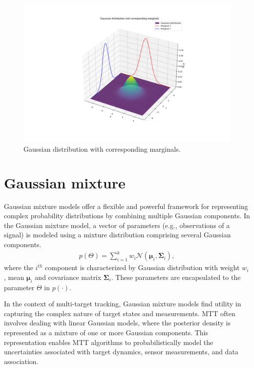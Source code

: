 \begin{figure}[htbp]
    \centering
    \includegraphics[width=1\textwidth]{text/chapter_01/imgs/gauss_with_marginals}
    \caption{Gaussian distribution with corresponding marginals.}
    \label{fig:gaussWithMarginals}
\end{figure}
    \section{Gaussian mixture}
Gaussian mixture models offer a flexible and powerful framework for representing complex probability distributions by
combining multiple Gaussian components. In the Gaussian mixture model, a vector of parameters (e.g., observations of a signal) is modeled using a mixture distribution comprising several Gaussian components.
    \begin{align}
        p(\Theta) = \sum_{i=1}^k w_i \mathcal{N}(\mathbf{\mu}_i, \mathbf{\Sigma}_i),
    \end{align}
where the $i^{th}$ component is characterized by Gaussian distribution with weight $w_i$, mean $\mathbf{\mu}
_i$ and covariance matrix $\mathbf{\Sigma}_i$. These parameters are encapsulated to the parameter $\Theta$ in $p(\cdot)$.

In the context of multi-target tracking, Gaussian mixture models find utility in capturing the complex nature of target states and measurements. MTT often involves dealing with linear Gaussian models, where the posterior density is represented as a mixture of one or more Gaussian components. This representation enables MTT algorithms to probabilistically model the uncertainties associated with target dynamics, sensor measurements, and data association.

